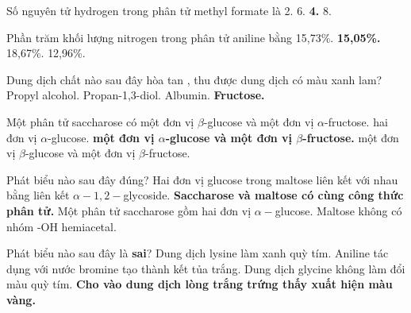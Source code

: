 \documentclass[11pt,a4paper]{article}
\begin{document}
\begin{ex}
Số nguyên tử hydrogen trong phân tử methyl formate là
\choice
{2.}
{6.}
{\textbf{\color{hfRed}4.}}
{8.}
\end{ex}
\begin{ex}
Phần trăm khối lượng nitrogen trong phân tử aniline bằng
\choice
{15,73\%.}
{\textbf{\color{hfRed}15,05\%.}}
{18,67\%.}
{12,96\%.}
\end{ex}
\begin{ex}
Dung dịch chất nào sau đây hòa tan , thu được dung dịch có màu xanh lam?
\choice
{Propyl alcohol.}
{Propan-1,3-diol.}
{Albumin.}
{\textbf{\color{hfRed}Fructose.}}
\end{ex}
\begin{ex}
Một phân tử saccharose có
\choice
{một đơn vị $\beta$-glucose và một đơn vị $\alpha$-fructose.}
{hai đơn vị $\alpha$-glucose.}
{\textbf{\color{hfRed}một đơn vị $\alpha$-glucose và một đơn vị $\beta$-fructose.}}
{một đơn vị $\beta$-glucose và một đơn vị $\beta$-fructose.}
\end{ex}
\begin{ex}
Phát biểu nào sau đây đúng?
\choice
{Hai đơn vị glucose trong maltose liên kết với nhau bằng liên kết $\alpha-1,2-$glycoside.}
{\textbf{\color{hfRed}Saccharose và maltose có cùng công thức phân tử.}}
{Một phân tử saccharose gồm hai đơn vị $\alpha-$glucose.}
{Maltose không có nhóm -OH hemiacetal.}
\end{ex}
\begin{ex}
Phát biểu nào sau đây là \textbf{sai}?
\choice
{Dung dịch lysine làm xanh quỳ tím.}
{Aniline tác dụng với nước bromine tạo thành kết tủa trắng.}
{Dung dịch glycine không làm đổi màu quỳ tím.}
{\textbf{\color{hfRed}Cho  vào dung dịch lòng trắng trứng thấy xuất hiện màu vàng.}}
\end{ex}
\end{document}
